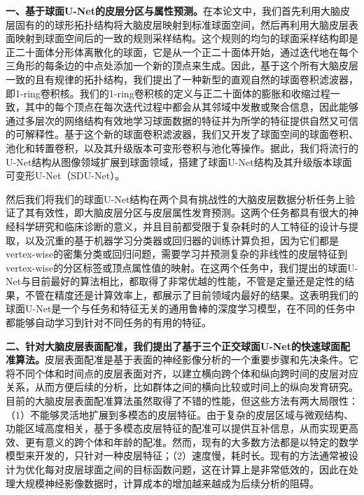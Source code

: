 \textbf{一、基于球面U-Net的皮层分区与属性预测。}在本论文中，我们首先利用大脑皮层固有的的球形拓扑结构将大脑皮层映射到标准球面空间，然后再利用大脑皮层表面映射到球面空间后的一致的规则采样结构。这个规则的均匀的球面采样结构即是正二十面体分形体离散化的球面，它是从一个正二十面体开始，通过迭代地在每个三角形的每条边的中点处添加一个新的顶点来生成。因此，基于这个所有大脑皮层一致的且有规律的拓扑结构，我们提出了一种新型的直观自然的球面卷积滤波器，即1-ring卷积核。我们的1-ring卷积核的定义与正二十面体的膨胀和收缩过程一致，其中的每个顶点在每次迭代过程中都会从其邻域中发散或聚合信息，因此能够通过多层次的网络结构有效地学习球面数据的特征并为所学的特征提供自然又可信的可解释性。基于这个新的球面卷积滤波器，我们又开发了球面空间的球面卷积、池化和转置卷积，以及其升级版本可变形卷积与池化等操作。据此，我们将流行的U-Net结构\cite{ronneberger2015u}从图像领域扩展到球面领域，搭建了球面U-Net结构及其升级版本球面可变形U-Net（SDU-Net）。

然后我们将我们的球面U-Net结构在两个具有挑战性的大脑皮层数据分析任务上验证了其有效性，即大脑皮层分区与皮层属性发育预测。这两个任务都具有很大的神经科学研究和临床诊断的意义，并且目前都受限于复杂耗时的人工特征的设计与提取，以及沉重的基于机器学习分类器或回归器的训练计算负担，因为它们都是vertex-wise的密集分类或回归问题，需要学习并预测复杂的非线性的皮层特征到vertex-wise的分区标签或顶点属性值的映射。在这两个任务中，我们提出的球面U-Net与目前最好的算法相比，都取得了非常优越的性能，不管是定量还是定性的结果，不管在精度还是计算效率上，都展示了目前领域内最好的结果。这表明我们的球面U-Net是一个与任务和特征无关的通用鲁棒的深度学习模型，在不同的任务中都能够自动学习到针对不同任务的有用的特征。

\textbf{二、针对大脑皮层表面配准，我们提出了基于三个正交球面U-Net的快速球面配准算法。}皮层表面配准是基于表面的神经影像分析的一个重要步骤和先决条件。它将不同个体和时间点的皮层表面对齐，以建立横向跨个体和纵向跨时间的皮层对应关系，从而方便后续的分析，比如群体之间的横向比较或时间上的纵向发育研究。目前的大脑皮层表面配准算法虽然取得了不错的性能，但这些方法有两大局限性：（1）不能够灵活地扩展到多模态的皮层特征。由于复杂的皮层区域与微观结构、功能区域高度相关，基于多模态皮层特征的配准可以提供互补信息，从而实现更高效、更有意义的跨个体和年龄的配准。然而，现有的大多数方法都是以特定的数学模型来开发的，只针对一种皮层特征；（2）速度慢，耗时长。现有的方法通常被设计为优化每对皮层球面之间的目标函数问题，这在计算上是非常低效的，因此在处理大规模神经影像数据时，计算成本的增加越来越成为后续分析的阻碍。

